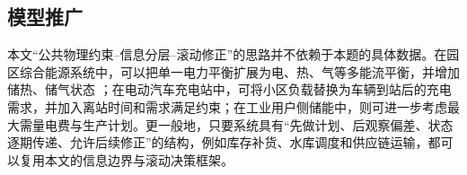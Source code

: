 \subsection{模型推广}

本文“公共物理约束--信息分层--滚动修正”的思路并不依赖于本题的具体数据。在园区综合能源系统中，可以把单一电力平衡扩展为电、热、气等多能流平衡，并增加储热、储气状态 \cite{liu2018dayahead}；在电动汽车充电站中，可将小区负载替换为车辆到站后的充电需求，并加入离站时间和需求满足约束；在工业用户侧储能中，则可进一步考虑最大需量电费与生产计划。更一般地，只要系统具有“先做计划、后观察偏差、状态逐期传递、允许后续修正”的结构，例如库存补货、水库调度和供应链运输，都可以复用本文的信息边界与滚动决策框架。

